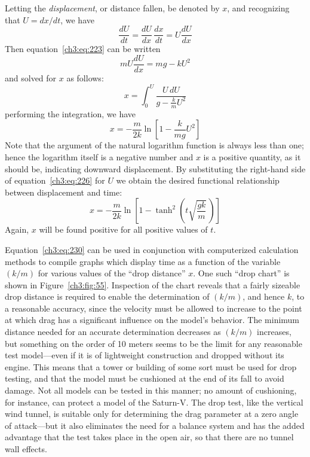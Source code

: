 Letting the \emph{displacement}, or distance fallen, be denoted by $x$, and
recognizing that $U = dx/dt$, we have
\begin{equation*}
\frac{dU}{dt} = \frac{dU}{dx}\,\frac{dx}{dt} = U\frac{dU}{dx}
\end{equation*}
Then equation~\eqref{ch3:eq:223} can be written
\begin{equation}\label{ch3:eq:227}
mU\frac{dU}{dx} = mg - kU^{2}
\end{equation}
and solved for $x$ as follows:
\begin{equation}\label{ch3:eq:228}
x = \int_{0}^{U}\frac{U\,dU}{g - \frac{k}{m}U^{2}}
\end{equation}
performing the integration, we have
\begin{equation}\label{ch3:eq:229}
x = -\frac{m}{2k}\ln\left[1 - \frac{k}{mg}U^{2}\right]
\end{equation}
Note that the argument of the natural logarithm function is always less than
one; hence the logarithm itself is a negative number and $x$ is a positive
quantity, as it should be, indicating downward displacement. By substituting
the right-hand side of equation~\eqref{ch3:eq:226} for $U$ we obtain the
desired functional relationship between displacement and time:
\begin{equation}\label{ch3:eq:230}
x = -\frac{m}{2k}\ln\left[1 - \tanh^{2}\left(t\sqrt{\frac{gk}{m}}\,\right)\right]
\end{equation}
Again, $x$ will be found positive for all positive values of $t$.

Equation~\eqref{ch3:eq:230} can be used in conjunction with computerized
calculation methods to compile graphs which display time as a function of the
variable $(k/m)$ for various values of the ``drop distance'' $x$. One such
``drop chart'' is shown in Figure~\ref{ch3:fig:55}. Inspection of the chart
reveals that a fairly sizeable drop distance is required to enable the
determination of $(k/m)$, and hence $k$, to a reasonable accuracy, since the
velocity must be allowed to increase to the point at which drag has a
significant influence on the model's behavior. The minimum distance needed for
an accurate determination decreases as $(k/m)$ increases, but something on the
order of 10 meters seems to be the limit for any reasonable test
model---even if it is of lightweight construction and dropped without its
engine. This means that a tower or building of some sort must be used for drop
testing, and that the model must be cushioned at the end of its fall to avoid
damage. Not all models can be tested in this manner; no amount of cushioning,
for instance, can protect a model of the Saturn-V. The drop test, like the
vertical wind tunnel, is suitable only for determining the drag parameter at a
zero angle of attack---but it also eliminates the need for a balance system
and has the added advantage that the test takes place in the open air, so that
there are no tunnel wall effects.

